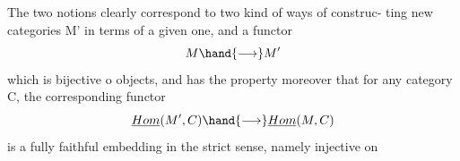 The two notions clearly correspond to two kind of ways of construc-%
ting new categories M' in terms of a given one, and a functor
\[ M \hand{\longrightarrow} M' \]
which is bijective o objects, and has the property moreover that for
any category C, the corresponding functor
\[ \underline{Hom}(M',C) \hand{\longrightarrow} \underline{Hom}(M,C) \]
is a fully faithful embedding in the strict sense, namely injective on

